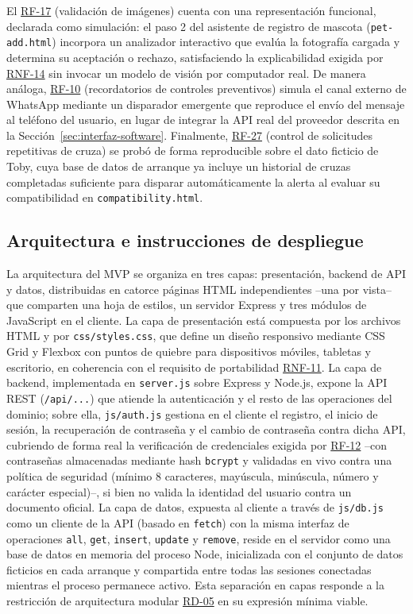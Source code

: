 \documentclass[journal,onecolumn]{IEEEtran}
\begin{document}
	El \hyperref[tab:RF-17]{RF-17} (validación de imágenes) cuenta con una representación funcional,
	declarada como simulación: el paso 2 del asistente de registro de mascota
	(\texttt{pet-add.html}) incorpora un analizador interactivo que evalúa la
	fotografía cargada y determina su aceptación o rechazo, satisfaciendo la
	explicabilidad exigida por \hyperref[tab:RNF-14]{RNF-14} sin invocar un modelo de visión por
	computador real. De manera análoga, \hyperref[tab:RF-10]{RF-10} (recordatorios de controles
	preventivos) simula el canal externo de WhatsApp mediante un disparador
	emergente que reproduce el envío del mensaje al teléfono del usuario, en
	lugar de integrar la API real del proveedor descrita en la
	Sección~\ref{sec:interfaz-software}. Finalmente, \hyperref[tab:RF-27]{RF-27} (control de
	solicitudes repetitivas de cruza) se probó de forma reproducible sobre el
	dato ficticio de Toby, cuya base de datos de arranque ya incluye un
	historial de cruzas completadas suficiente para disparar automáticamente
	la alerta al evaluar su compatibilidad en \texttt{compatibility.html}.
	
	\subsection{Arquitectura e instrucciones de despliegue}
	\label{sec:mvp-arquitectura}
	
	La arquitectura del MVP se organiza en tres capas: presentación, backend de
	API y datos, distribuidas en catorce páginas HTML independientes --una por
	vista-- que comparten una hoja de estilos, un servidor Express y tres
	módulos de JavaScript en el cliente. La capa de presentación está
	compuesta por los archivos HTML y por \texttt{css/styles.css}, que define
	un diseño responsivo mediante CSS Grid y Flexbox con puntos de quiebre
	para dispositivos móviles, tabletas y escritorio, en coherencia con el
	requisito de portabilidad \hyperref[tab:RNF-11]{RNF-11}. La capa de backend, implementada en
	\texttt{server.js} sobre Express y Node.js, expone la API REST
	(\texttt{/api/...}) que atiende la autenticación y el resto de las
	operaciones del dominio; sobre ella, \texttt{js/auth.js} gestiona en el
	cliente el registro, el inicio de sesión, la recuperación de contraseña y
	el cambio de contraseña contra dicha API, cubriendo de forma real la
	verificación de credenciales exigida por \hyperref[tab:RF-12]{RF-12} --con contraseñas
	almacenadas mediante hash \texttt{bcrypt} y validadas en vivo contra una
	política de seguridad (mínimo 8 caracteres, mayúscula, minúscula, número y
	carácter especial)--, si bien no valida la identidad del usuario contra un
	documento oficial. La capa de datos, expuesta al cliente a través de
	\texttt{js/db.js} como un cliente de la API (basado en \texttt{fetch}) con
	la misma interfaz de operaciones \texttt{all}, \texttt{get},
	\texttt{insert}, \texttt{update} y \texttt{remove}, reside en el servidor
	como una base de datos en memoria del proceso Node, inicializada con el
	conjunto de datos ficticios en cada arranque y compartida entre todas las
	sesiones conectadas mientras el proceso permanece activo. Esta separación
	en capas responde a la restricción de arquitectura modular \hyperref[tab:RD-05]{RD-05} en su
	expresión mínima viable.
	
\end{document}
